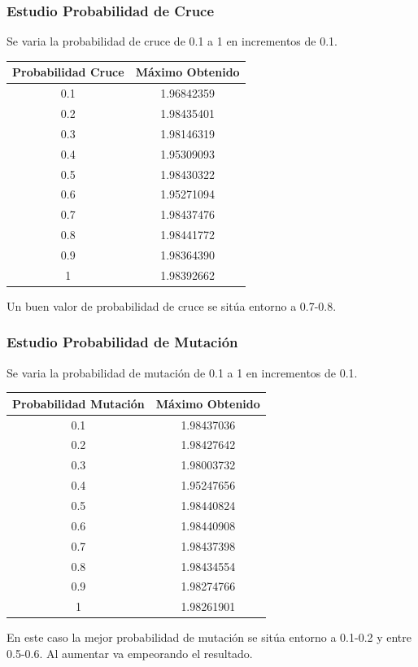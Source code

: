 \documentclass[12pt]{article}
\begin{document}
\subsubsection*{Estudio Probabilidad de Cruce}
	Se varia la probabilidad de cruce de 0.1 a 1 en incrementos de 0.1.
\begin{table}[H]
\begin{center}
\begin{tabular}{|cc|} \hline
Probabilidad Cruce & Máximo Obtenido \\  \hline
0.1 & 1.96842359 \\ 
0.2 & 1.98435401 \\ 
0.3 & 1.98146319 \\
0.4 & 1.95309093 \\
0.5 & 1.98430322 \\
0.6 & 1.95271094 \\
0.7 & 1.98437476 \\
0.8 & 1.98441772 \\ 
0.9 & 1.98364390 \\
1   & 1.98392662 \\  \hline
\end{tabular}
\end{center}
\end{table}
	Un buen valor de probabilidad de cruce se sitúa entorno a 0.7-0.8.

\subsubsection*{Estudio Probabilidad de Mutación}
	Se varia la probabilidad de mutación de 0.1 a 1 en incrementos de 0.1.
\begin{table}[H]
\begin{center}
\begin{tabular}{|cc|} \hline
Probabilidad Mutación & Máximo Obtenido \\  \hline
0.1 & 1.98437036 \\ 
0.2 & 1.98427642 \\ 
0.3 & 1.98003732 \\
0.4 & 1.95247656 \\
0.5 & 1.98440824 \\
0.6 & 1.98440908 \\
0.7 & 1.98437398 \\
0.8 & 1.98434554 \\ 
0.9 & 1.98274766 \\
1   & 1.98261901 \\  \hline
\end{tabular}
\end{center}
\end{table}
	En este caso la mejor probabilidad de mutación se sitúa entorno a 0.1-0.2 y entre 0.5-0.6. Al aumentar va empeorando el resultado.	
\end{document}
